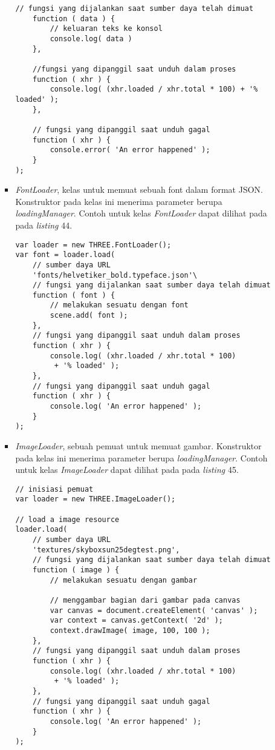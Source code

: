 \documentclass[a4paper,twoside]{article}
\begin{document}
\begin{enumerate}
\begin{itemize}
\begin{itemize}
\begin{lstlisting}[caption={Contoh penggunaan kelas {\it FileLoader} untuk berkas dengan format TXT.},captionpos=b]
    // fungsi yang dijalankan saat sumber daya telah dimuat
    function ( data ) {
        // keluaran teks ke konsol
        console.log( data )
    },

    //fungsi yang dipanggil saat unduh dalam proses
    function ( xhr ) {
        console.log( (xhr.loaded / xhr.total * 100) + '% loaded' );
    },

    // fungsi yang dipanggil saat unduh gagal
    function ( xhr ) {
        console.error( 'An error happened' );
    }
);

\end{lstlisting}

	\item {\it FontLoader}, kelas untuk memuat sebuah font dalam format JSON. Konstruktor pada kelas ini menerima parameter berupa  {\it loadingManager}. Contoh untuk kelas {\it FontLoader} dapat dilihat pada pada {\it listing} 44.
	
\begin{lstlisting}[caption={Contoh penggunaan kelas {\it FontLoader}.},captionpos=b]
var loader = new THREE.FontLoader();
var font = loader.load(
	// sumber daya URL
	'fonts/helvetiker_bold.typeface.json'\
	// fungsi yang dijalankan saat sumber daya telah dimuat
	function ( font ) {
		// melakukan sesuatu dengan font
		scene.add( font );
	},
	// fungsi yang dipanggil saat unduh dalam proses
	function ( xhr ) {
		console.log( (xhr.loaded / xhr.total * 100)
		 + '% loaded' );
	},
	// fungsi yang dipanggil saat unduh gagal
	function ( xhr ) {
		console.log( 'An error happened' );
	}
);
\end{lstlisting}

	\item {\it ImageLoader}, sebuah pemuat untuk memuat gambar. Konstruktor pada kelas ini menerima parameter berupa  {\it loadingManager}. Contoh untuk kelas {\it ImageLoader} dapat dilihat pada pada {\it listing} 45.
	
\begin{lstlisting}[caption={Contoh penggunaan kelas {\it ImageLoader}.},captionpos=b]
// inisiasi pemuat
var loader = new THREE.ImageLoader();

// load a image resource
loader.load(
	// sumber daya URL
	'textures/skyboxsun25degtest.png',
	// fungsi yang dijalankan saat sumber daya telah dimuat
	function ( image ) {
		// melakukan sesuatu dengan gambar

		// menggambar bagian dari gambar pada canvas
		var canvas = document.createElement( 'canvas' );
		var context = canvas.getContext( '2d' );
		context.drawImage( image, 100, 100 );
	},
	// fungsi yang dipanggil saat unduh dalam proses
	function ( xhr ) {
		console.log( (xhr.loaded / xhr.total * 100)
		 + '% loaded' );
	},
	// fungsi yang dipanggil saat unduh gagal
	function ( xhr ) {
		console.log( 'An error happened' );
	}
);
\end{lstlisting}


\end{itemize}
\end{itemize}
\end{enumerate}
\end{document}
